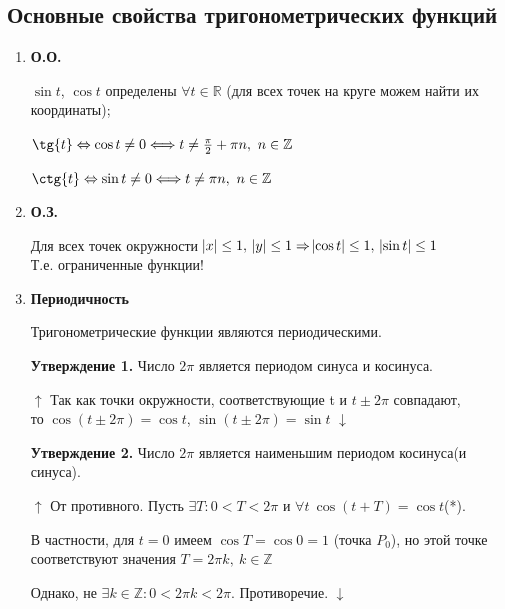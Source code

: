 \documentclass{article}
\begin{document}
      	\subsection{Основные свойства тригонометрических функций}
        
        \begin{enumerate}
        	\item \textbf{О.О.} 
          	
            \(\sin{t}\), \(\cos{t}\) определены \(\forall t \in \mathbb{R}\) (для всех точек на круге можем найти их координаты);
            
            \(\tg{t} \Leftrightarrow \cos{t} \not = 0 \Longleftrightarrow t \not = \frac{\pi}{2} + \pi n,\ n \in \mathbb{Z}\)

			\(\ctg{t} \Leftrightarrow \sin{t} \not = 0 \Longleftrightarrow t \not = \pi n,\ n \in \mathbb{Z}\)
            
            \item \textbf{О.З.}
            
            Для всех точек окружности \(\abs{x} \leq 1,\ \abs{y} \leq 1 \Rightarrow \abs{\cos{t}} \leq 1,\ \abs{\sin{t}} \leq 1\)
            \\Т.е. ограниченные функции!
            
            \item \textbf{Периодичность}
            
            Тригонометрические функции являются периодическими.
            
            \textbf{Утверждение 1.} Число \(2 \pi\) является периодом синуса и косинуса.
            
            \(\uparrow\) Так как точки окружности, соответствующие t и \(t \pm 2 \pi\) совпадают,\\
            то \(\cos{(t \pm 2 \pi)} = \cos{t}\), \(\sin{(t \pm 2 \pi)} = \sin{t}\) \(\downarrow\)
        
            \textbf{Утверждение 2.} Число \(2 \pi\) является наименьшим периодом косинуса(и синуса).
            
            \(\uparrow\) От противного. Пусть \(\exists T: 0 < T < 2 \pi\) и \(\forall t \ \cos{(t+T)} = \cos{t}\)(*).
            
            В частности, для \(t=0\) имеем \(\cos{T} = \cos{0} = 1\) (точка \(P_0\)), но этой точке соответствуют значения \(T = 2 \pi k, \ k \in \mathbb{Z}\)
            
            Однако, не \(\exists k \in \mathbb{Z}: 0 < 2 \pi k < 2 \pi\). Противоречие. \(\downarrow\)
            

\end{enumerate}
\end{document}
